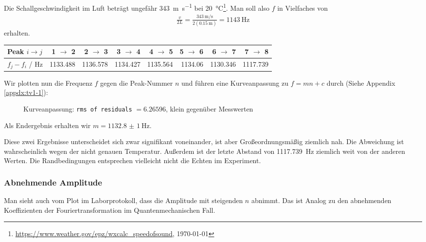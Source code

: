 			Die Schallgeschwindigkeit im Luft beträgt ungefähr \SI{343}{\meter\per\second} bei \SI{20}{\celsius}\footnote{\url{https://www.weather.gov/epz/wxcalc_speedofsound}, \today}. Man soll also $f$ in Vielfaches von 
			\begin{align}
				\frac{v}{2L} = \frac{\SI{343}{\meter\per\second}}{2\left(\SI{0.15}{\meter}\right)} = \SI{1143}{\hertz}
			\end{align}
			erhalten.
			\begin{center}
				\begin{tabular}{l *{7}{r}}
					\toprule
					Peak $i \rightarrow j$ & \num{1} $\rightarrow$ \num{2} & \num{2} $\rightarrow$ \num{3} & \num{3} $\rightarrow$ \num{4} & \num{4} $\rightarrow$ \num{5} & \num{5} $\rightarrow$ \num{6} & \num{6} $\rightarrow$ \num{7} & \num{7} $\rightarrow$ \num{8} \\
					\midrule
					$f_j - f_i$ / \si{\hertz} & \num{1133.488} & \num{1136.578} & \num{1134.427} & \num{1135.564} & \num{1134.06} & \num{1130.346} & \num{1117.739} \\
					\bottomrule
				\end{tabular}
			\end{center}
			Wir plotten nun die Frequenz $f$ gegen die Peak-Nummer $n$ und führen eine Kurveanpassung zu $f = mn + c$ durch (Siehe Appendix \ref{appdx:tv1-1}):
			\begin{figure}[!ht]
			    \centering
			    
			    \caption{Kurveanpassung: \texttt{rms of residuals} $=\num{6.26596}$, klein gegenüber Messwerten}
			    \label{fig:tv1-1}
			\end{figure}

			Als Endergebnis erhalten wir $m = \SI{1132.8(10)}{\hertz}$.


			Diese zwei Ergebnisse unterscheidet sich zwar signifikant voneinander, ist aber Großeordnungsmäßig ziemlich nah. Die Abweichung ist wahrscheinlich wegen der nicht genauen Temperatur. Außerdem ist der letzte Abstand von \SI{1117.739}{\hertz} ziemlich weit von der anderen Werten. Die Randbedingungen entsprechen vielleicht nicht die Echten im Experiment.

		\subsubsection{Abnehmende Amplitude}
			Man sieht auch vom Plot im Laborprotokoll, dass die Amplitude mit steigenden $n$ abnimmt. Das ist Analog zu den abnehmenden Koeffizienten der Fouriertransformation im Quantenmechanischen Fall.

